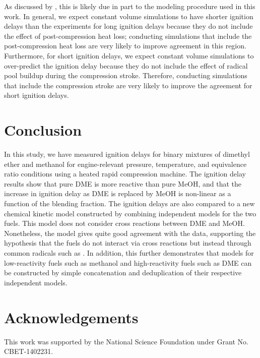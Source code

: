 \documentclass[12pt]{../ussci}
\begin{document}
As discussed by \textcite{Mittal2008}, this is likely due in part to the
modeling procedure used in this work. In general, we expect constant volume
simulations to have shorter ignition delays than the experiments for long
ignition delays because they do not include the effect of post-compression heat
loss; conducting simulations that include the post-compression heat loss are
very likely to improve agreement in this region. Furthermore, for short ignition
delays, we expect constant volume simulations to over-predict the ignition delay
because they do not include the effect of radical pool buildup during the
compression stroke. Therefore, conducting simulations that include the
compression stroke are very likely to improve the agreement for short ignition
delays.

\section{Conclusion}\label{sec:conclusion}

In this study, we have measured ignition delays for binary mixtures of dimethyl
ether and methanol for engine-relevant pressure, temperature, and equivalence
ratio conditions using a heated rapid compression machine. The ignition delay
results show that pure DME is more reactive than pure MeOH, and that the
increase in ignition delay as DME is replaced by MeOH is non-linear as a
function of the blending fraction. The ignition delays are also compared to a
new chemical kinetic model constructed by combining independent models for the
two fuels. This model does not consider cross reactions between DME and MeOH.
Nonetheless, the model gives quite good agreement with the data, supporting the
hypothesis that the fuels do not interact via cross reactions but instead
through common radicals such as . In addition, this further demonstrates that models for low-reactivity fuels such as methanol and high-reactivity fuels such as DME can be constructed by simple concatenation and deduplication of their respective independent models.

\section{Acknowledgements}\label{acknowledgements}

This work was supported by the National Science Foundation under Grant No.
CBET-1402231.

\printbibliography
\end{document}
